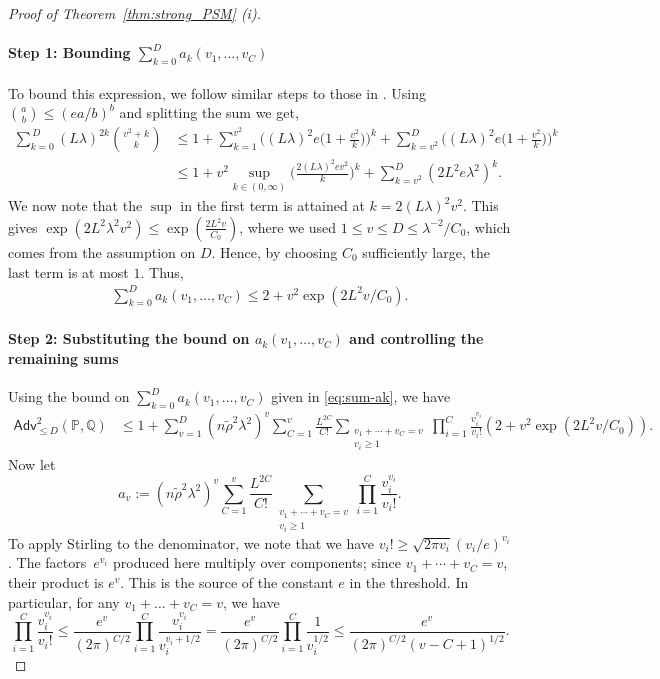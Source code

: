 \documentclass[11pt, letterpaper]{article}
\numberwithin{equation}{section}
\newcommand{\Adv}{\mathsf{Adv}}
\newcommand{\PP}{\mathbb{P}}
\newcommand{\QQ}{\mathbb{Q}}
\begin{document}
\begin{proof}[Proof of Theorem~\ref{thm:strong_PSM} \textnormal{(i)}]
\paragraph*{Step 1: Bounding $\sum_{k=0}^D a_k(v_1,\ldots,v_C)$} 
To bound this expression, we follow similar steps to those
in \cite[Proof of Theorem 2.2 (a)]{sohn2025sharp}. Using $\binom{a}{b}\leq (ea/b)^b$ and splitting the sum we get,
\begin{align*}
\sum_{k=0}^{\,D}
   (L\lambda)^{2k} \binom{ v^2+k}{k}
   &\leq1+\sum_{ k=1}^{v^2}  \bigg((L\lambda)^2e\bigg(1+\frac{v^2}{k}\bigg)\bigg)^k+\sum_{{ k=v^2}}^{D} \bigg((L\lambda)^2e\bigg(1+\frac{v^2}{k}\bigg)\bigg)^k\\       
   &\leq 1+ v^2\sup_{k \in (0,\infty)} \bigg(\frac{2(L\lambda)^2e{ v^2}}{k}\bigg)^k+\sum_{k=v^2}^{D} (2L^2e\lambda^2)^k.
\end{align*}
We now note that the $\sup$ in the first term is attained at $k=2(L\lambda)^2v^2$. This gives $\exp(2L^2\lambda^2 v^2)\le \exp\left(\frac{2L^2v}{C_0}\right)$, where we used  \(1 \leq v \leq D \leq \lambda^{-2}/C_0\), which comes from the assumption on \(D\).
Hence, by choosing $C_0$ sufficiently large, the last term is at most $1$. Thus,
\begin{align}\label{eq:sum-ak}
   \sum_{k=0}^D a_k(v_1,\ldots,v_C)\leq 2+ v^2\exp(2L^2 v /C_0).
\end{align}

 \paragraph*{Step 2: Substituting the bound on $a_k(v_1,\ldots,v_C)$ and controlling the remaining sums} Using the bound on $\sum_{k=0}^D a_k(v_1,\ldots,v_C)$ given in \eqref{eq:sum-ak}, we have
 {\small \begin{align*}     
\Adv_{\leq D}^2(\PP,\QQ)
&\leq
1+
\sum_{v=1}^{D}
(n\tilde{\rho}^2\lambda^2)^{v}
\sum_{C=1}^{v}
\frac{L^{2C}}{C!}
\sum_{\substack{v_1+\cdots+v_C=v\\ v_i\ge 1}}
\prod_{i=1}^C\frac{v_i^{v_i}}{v_i!}
\left(2+ v^2\exp(2L^2v/C_0)\right).
\end{align*}}
Now let \[a_v:=({ n}\tilde{\rho}^2\lambda^2)^{v}
\sum_{C=1}^{v}
\frac{L^{2C}}{C!}
\sum_{\substack{v_1+\cdots+v_C=v\\ v_i\ge 1}}
\prod_{i=1}^C\frac{v_i^{v_i}}{v_i!}.\] To apply Stirling to the denominator, we note that we have $v_i! \geq \sqrt{2\pi v_i} (v_i/e)^{v_i}$. The factors~$e^{v_i}$ produced here multiply over components; since $v_1+\cdots+v_C=v$, their product is $e^v$. This is the source of the constant $e$ in the threshold. In particular, for any $v_1+\ldots+v_C=v$, we have
\[ \prod_{i=1}^C \frac{v_i^{v_i}}{v_i!}\leq \frac{e^v}{(2\pi)^{C/2}} \prod_{i=1}^C \frac{v_i^{v_i}}{v_i^{v_i + 1/2}} = \frac{e^v}{(2\pi)^{C/2}} \prod_{i=1}^C \frac{1}{v_i^{1/2}}  \leq \frac{e^v}{(2\pi)^{C/2}(v-C+1)^{1/2}}
.\]


\end{proof}
\end{document}
